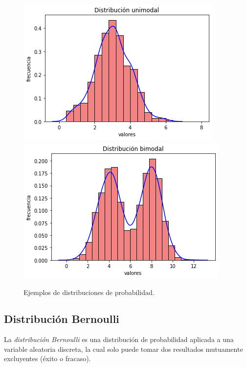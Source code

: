 \documentclass[oneside,openright,titlepage,numbers=noenddot,openany,headinclude,footinclude=true,
cleardoublepage=empty,abstractoff,BCOR=5mm,paper=a4,fontsize=12pt,main=spanish]{scrreprt}
\begin{document}
\begin{figure}[h]
      \includegraphics[width=\linewidth]{images/unimodal.png}
    \endminipage\hfill
      \includegraphics[width=\linewidth]{images/bimodal.png}
    \endminipage
     \caption{Ejemplos de distribuciones de probabilidad.}
\end{figure}

\subsection{Distribución Bernoulli}

La \textit{distribución Bernoulli} es una distribución de probabilidad aplicada a una variable aleatoria discreta, la cual solo puede tomar dos resultados mutuamente excluyentes (éxito o fracaso).\\
\end{document}

